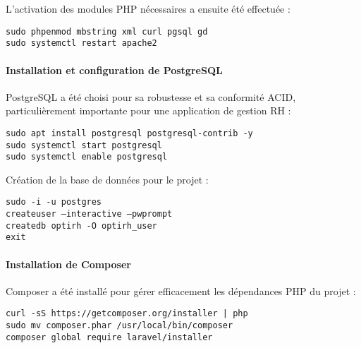 L'activation des modules PHP nécessaires a ensuite été effectuée :

\begin{tcolorbox}[colback=black, coltext=white, title=Activation des modules PHP, fonttitle=\bfseries]
\texttt{sudo phpenmod mbstring xml curl pgsql gd} \\
\texttt{sudo systemctl restart apache2}
\end{tcolorbox}

\paragraph{Installation et configuration de PostgreSQL}
PostgreSQL a été choisi pour sa robustesse et sa conformité ACID, particulièrement importante pour une application de gestion RH :

\begin{tcolorbox}[colback=black, coltext=white, title=Installation de PostgreSQL, fonttitle=\bfseries]
\texttt{sudo apt install postgresql postgresql-contrib -y} \\
\texttt{sudo systemctl start postgresql} \\
\texttt{sudo systemctl enable postgresql}
\end{tcolorbox}

Création de la base de données pour le projet :

\begin{tcolorbox}[colback=black, coltext=white, title=Configuration de la base de données, fonttitle=\bfseries]
\texttt{sudo -i -u postgres} \\
\texttt{createuser --interactive --pwprompt} \\
\texttt{createdb optirh -O optirh\_user} \\
\texttt{exit}
\end{tcolorbox}

\paragraph{Installation de Composer}
Composer a été installé pour gérer efficacement les dépendances PHP du projet :

\begin{tcolorbox}[colback=black, coltext=white, title=Installation de Composer, fonttitle=\bfseries]
\texttt{curl -sS https://getcomposer.org/installer | php} \\
\texttt{sudo mv composer.phar /usr/local/bin/composer} \\
\texttt{composer global require laravel/installer}
\end{tcolorbox}

